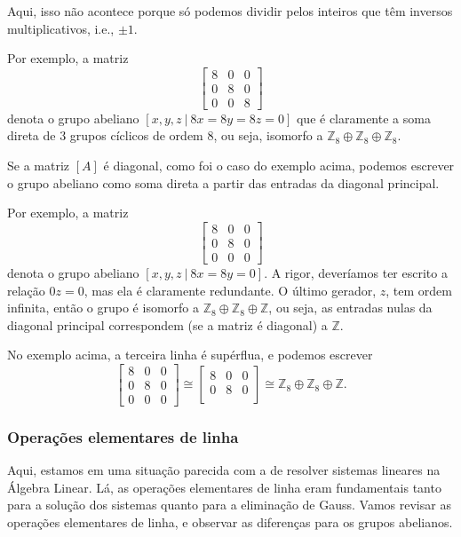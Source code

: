     	Aqui, isso não acontece porque só podemos dividir pelos inteiros que têm inversos multiplicativos, 
    	i.e., $\pm 1$.
    	\begin{example}
    	Por exemplo, a matriz
    	\[
    	\begin{bmatrix}
    	8 & 0 & 0 \\
    	0 & 8 & 0 \\
    	0 & 0 & 8 
    	\end{bmatrix}
    	\]
    	denota o grupo abeliano $[x,y,z \ \vert \ 8x=8y=8z=0]$ que é claramente a soma direta 
    	de $3$ grupos cíclicos de ordem $8$, ou seja, isomorfo a
    	$\mathbb{Z}_8\oplus\mathbb{Z}_8\oplus\mathbb{Z}_8$.
    	\end{example}
    	Se a matriz $[A]$ é diagonal, como foi o caso 
    	do exemplo acima, podemos escrever o grupo abeliano como soma direta a partir das 
    	entradas da diagonal
    	principal. 
    	\begin{example}
    	Por exemplo, a matriz
    	\[
    	\begin{bmatrix}
    	8 & 0 & 0 \\
    	0 & 8 & 0 \\
    	0 & 0 & 0 
    	\end{bmatrix}
    	\]
    	denota o grupo abeliano $[x,y,z \ \vert \ 8x=8y=0]$. A rigor, deveríamos 
    	ter escrito a relação $0z=0$, mas ela é claramente redundante. O último gerador, $z$, 
    	tem ordem infinita,
    	então o grupo é isomorfo a $\mathbb{Z}_8\oplus\mathbb{Z}_8\oplus\mathbb{Z}$, ou seja, as entradas 
    	nulas da diagonal principal correspondem (se a matriz é diagonal) a $\mathbb{Z}$.
    	\end{example}
    	No exemplo acima, 
    	a terceira linha é supérflua, e podemos escrever
    	\[
    	\begin{bmatrix}
    	8 & 0 & 0 \\
    	0 & 8 & 0 \\
    	0 & 0 & 0
    	\end{bmatrix}\cong \begin{bmatrix}
    	8 & 0 & 0 \\
    	0 & 8 & 0 \\ 
    	\end{bmatrix} \cong \mathbb{Z}_8\oplus\mathbb{Z}_8\oplus\mathbb{Z}.
    	\]
    	\subsubsection{Operações elementares de linha}
    	Aqui, estamos em uma situação parecida com a de resolver sistemas lineares na Álgebra Linear. 
    	Lá, as operações elementares de linha eram fundamentais tanto para a solução dos sistemas quanto 
    	para a eliminação de Gauss. Vamos revisar as operações elementares de linha, e observar as 
    	diferenças para os grupos abelianos.
    	
